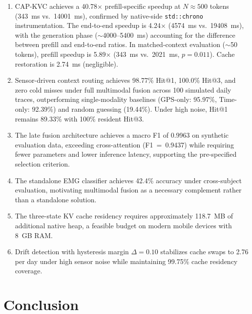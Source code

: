 \documentclass[journal]{IEEEtran}
\begin{document}
\begin{enumerate}
    \item CAP-KVC achieves a 40.78$\times$ prefill-specific speedup at $N \approx 500$ tokens (343~ms vs.\ 14001~ms), confirmed by native-side \texttt{std::chrono} instrumentation. The end-to-end speedup is 4.24$\times$ (4574~ms vs.\ 19408~ms), with the generation phase ($\sim$4000--5400~ms) accounting for the difference between prefill and end-to-end ratios. In matched-context evaluation ($\sim$50 tokens), prefill speedup is 5.89$\times$ (343~ms vs.\ 2021~ms, $p = 0.011$). Cache restoration is 2.74~ms (negligible).

    \item Sensor-driven context routing achieves 98.77\% Hit@1, 100.0\% Hit@3, and zero cold misses under full multimodal fusion across 100 simulated daily traces, outperforming single-modality baselines (GPS-only: 95.97\%, Time-only: 92.39\%) and random guessing (19.44\%). Under high noise, Hit@1 remains 89.33\% with 100\% resident Hit@3.

    \item The late fusion architecture achieves a macro F1 of 0.9963 on synthetic evaluation data, exceeding cross-attention (F1~=~0.9437) while requiring fewer parameters and lower inference latency, supporting the pre-specified selection criterion.

    \item The standalone EMG classifier achieves 42.4\% accuracy under cross-subject evaluation, motivating multimodal fusion as a necessary complement rather than a standalone solution.

    \item The three-state KV cache residency requires approximately 118.7~MB of additional native heap, a feasible budget on modern mobile devices with 8~GB RAM.

    \item Drift detection with hysteresis margin $\Delta = 0.10$ stabilizes cache swaps to 2.76 per day under high sensor noise while maintaining 99.75\% cache residency coverage.
\end{enumerate}

\section{Conclusion}
\label{sec:conclusion}
\end{document}
